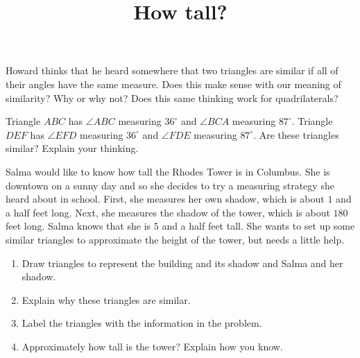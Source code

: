 \documentclass[nooutcomes,noauthor]{ximera}
\title{How tall?}
\begin{document}
\begin{abstract}
\end{abstract}

\maketitle

\begin{problem}
Howard thinks that he heard somewhere that two triangles are similar if all of their angles have the same measure. Does this make sense with our meaning of similarity? Why or why not? Does this same thinking work for quadrilaterals?
\end{problem}

\begin{problem}
Triangle $ABC$ has $\angle ABC$ measuring $36^{\circ}$ and $\angle BCA$ measuring $87^{\circ}$. Triangle $DEF$ has $\angle EFD$ measuring $36^{\circ}$ and $\angle FDE$ measuring $87^{\circ}$. Are these triangles similar? Explain your thinking.
\end{problem}


\begin{problem}
Salma would like to know how tall the Rhodes Tower is in Columbus. She is downtown on a sunny day and so she decides to try a measuring strategy she heard about in school. First, she measures her own shadow, which is about $1$ and a half feet long. Next, she measures the shadow of the tower, which is about $180$ feet long. Salma knows that she is $5$ and a half feet tall. She wants to set up some similar triangles to approximate the height of the tower, but needs a little help.
\begin{enumerate}
	\item Draw triangles to represent the building and its shadow and Salma and her shadow.
	\item Explain why these triangles are similar.
	\item Label the triangles with the information in the problem.
	\item Approximately how tall is the tower? Explain how you know.
\end{enumerate}
\end{problem}
\end{document}

